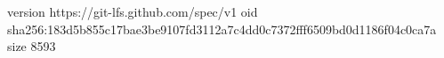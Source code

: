version https://git-lfs.github.com/spec/v1
oid sha256:183d5b855c17bae3be9107fd3112a7c4dd0c7372fff6509bd0d1186f04c0ca7a
size 8593
